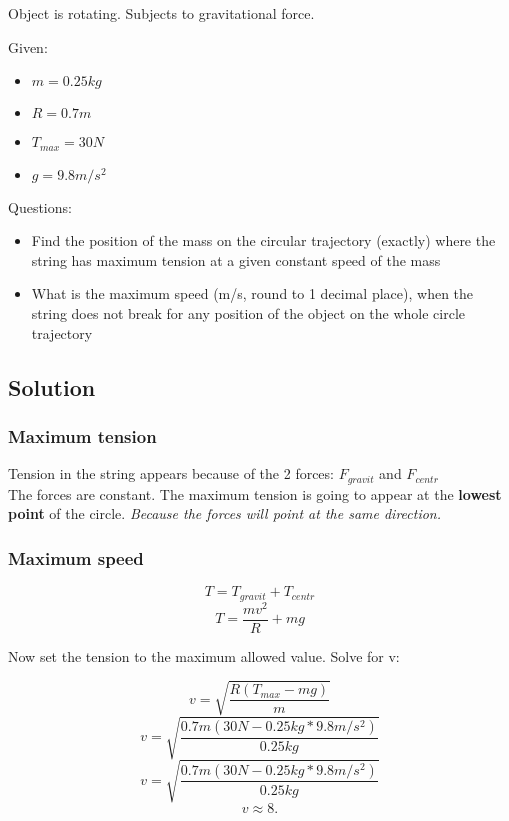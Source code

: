 
Object is rotating. Subjects to gravitational force.


\bigbreak Given: 
\begin{itemize}
    \item $  m  = 0.25kg $
    \item $ R = 0.7m $
    \item $ T_{max} = 30N $
    \item $ g = 9.8m/s^2 $
\end{itemize}


\bigbreak Questions:
\begin{itemize}
    \item Find the position of the mass on the circular trajectory (exactly) where the string has
    maximum tension at a given constant speed of the mass
    \item What is the maximum speed (m/s, round to 1 decimal place), when the string does not
    break for any position of the object on the whole circle trajectory
\end{itemize}

\subsection*{Solution}
\subsubsection*{Maximum tension}
Tension in the string appears because of the 2 forces: $F_{gravit}$ and $F_{centr}$ \\
The forces are constant. The maximum tension is going to appear at the \textbf{lowest point} of the circle.
\textit{Because the forces will point at the same direction.}


\subsubsection*{Maximum speed}
$$ T = T_{gravit} + T_{centr} $$
$$ T = \frac{mv^2}{R} + mg $$

Now set the tension to the maximum allowed value. Solve for v:

$$  v =  \sqrt{\frac{R(T_{max} - mg)}{m}} $$
$$  v =  \sqrt{\frac{0.7m(30N - 0.25kg * 9.8m/s^2)}{0.25kg}} $$
$$  v =  \sqrt{\frac{0.7m(30N - 0.25kg * 9.8m/s^2)}{0.25kg}} $$
$$  v \approx  8. $$


